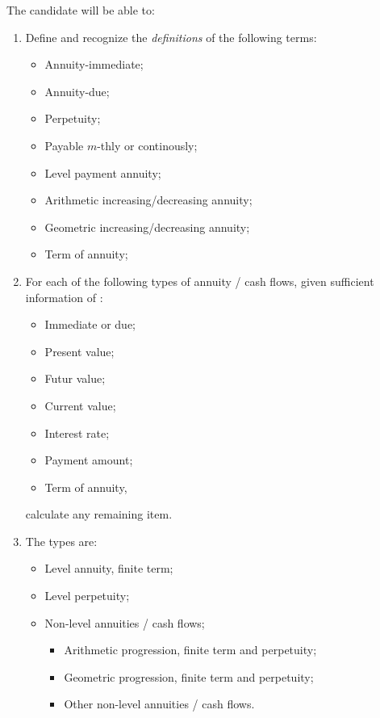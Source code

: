 \begin{outcomes}
The candidate will be able to:
\begin{enumerate}[label = \alph*)]
	\item	Define and recognize the \textit{definitions} of the following terms:
		\begin{multicols*}{2}
		\begin{itemize}[leftmargin = *]
		\item	Annuity-immediate;
		\item	Annuity-due;
		\item	Perpetuity;
		\item	Payable $m$-thly or continously;
		\item	Level payment annuity;
		\item	Arithmetic increasing/decreasing annuity;
		\item	Geometric increasing/decreasing annuity;
		\item	Term of annuity;
		\end{itemize}
		\end{multicols*}
	\item	For each of the following types of annuity / cash flows, given sufficient information of :
		\begin{multicols*}{2}
		\begin{itemize}[leftmargin = *]
		\item	Immediate or due;
		\item	Present value;
		\item	Futur value;
		\item	Current value;
		\item	Interest rate;
		\item	Payment amount;
		\item	Term of annuity,
		\end{itemize}
		\end{multicols*}
		calculate any remaining item. 
	\item[]	The types are:
		\begin{itemize}[leftmargin = *]
		\item	Level annuity, finite term;
		\item	Level perpetuity;
		\item	Non-level annuities / cash flows;
			\begin{itemize}
			\item	Arithmetic progression, finite term and perpetuity;
			\item	Geometric progression, finite term and perpetuity;
			\item	Other non-level annuities / cash flows.
			\end{itemize}
		\end{itemize}
\end{enumerate}
\end{outcomes}


